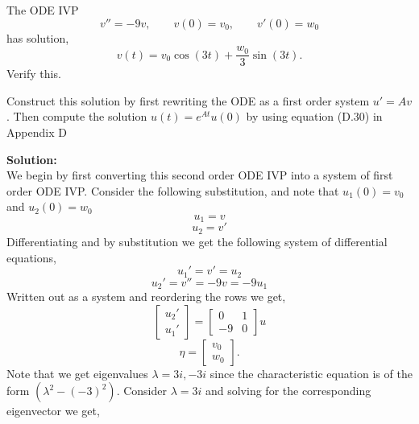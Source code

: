 \documentclass[12pt]{article}
\makeatletter
\theoremstyle{homework}
\newenvironment{exercise}[1]
{\def\@currentlabel{#1}\exercisecore}
{\endexercisecore}
\newcommand{\localhead}[1]{\par\smallskip\noindent\textbf{#1}\nobreak\\}%
\newcommand\solution{\localhead{Solution:}}
\makeatother
\begin{document}
\begin{exercise}{Problem P26} The ODE IVP
  \begin{equation*}
    v'' = -9v, \qquad v(0) = v_0, \qquad v'(0) = w_0
  \end{equation*}
  has solution, 
  \begin{equation*}
    v(t) = v_0\cos(3t) + \frac{w_0}{3}\sin(3t).
  \end{equation*}
  Verify this. 

  Construct this solution by first rewriting the ODE as a first order system $u' = Av$.
  Then compute the solution $u(t) = e^{At}u(0)$ by using equation (D.30) in Appendix D 
  \solution We begin by first converting this second order ODE IVP into a system of first order ODE
  IVP. Consider the following substitution, and note that $u_1(0) = v_0$ and $u_2(0) = w_0$
  \begin{equation*}
    u_1 = v
  \end{equation*}
  \begin{equation*}
    u_2 = v'
  \end{equation*}
  Differentiating and by substitution we get the following system of differential equations, 
  \begin{equation*}
    u_1' = v' = u_2
  \end{equation*}
  \begin{equation*}
    u_2' = v'' = -9v = -9u_1
  \end{equation*}
  Written out as a system and reordering the rows we get, 
  \begin{equation*}
    \begin{bmatrix}
      u_2'\\
      u_1'
    \end{bmatrix} = \begin{bmatrix}
      0 & 1\\
      -9 & 0
    \end{bmatrix}
    u
  \end{equation*}
  \begin{equation*}
    \eta = \begin{bmatrix}
      v_0\\
      w_0
    \end{bmatrix}.
  \end{equation*}
  Note that we get eigenvalues $\lambda = 3i, -3i$ since the characteristic equation is of the form $(\lambda^2 - (-3)^2)$.
  Consider $\lambda = 3i$ and solving for the corresponding eigenvector we get, 
  \begin{align*}

\end{align*}
\end{exercise}
\end{document}
